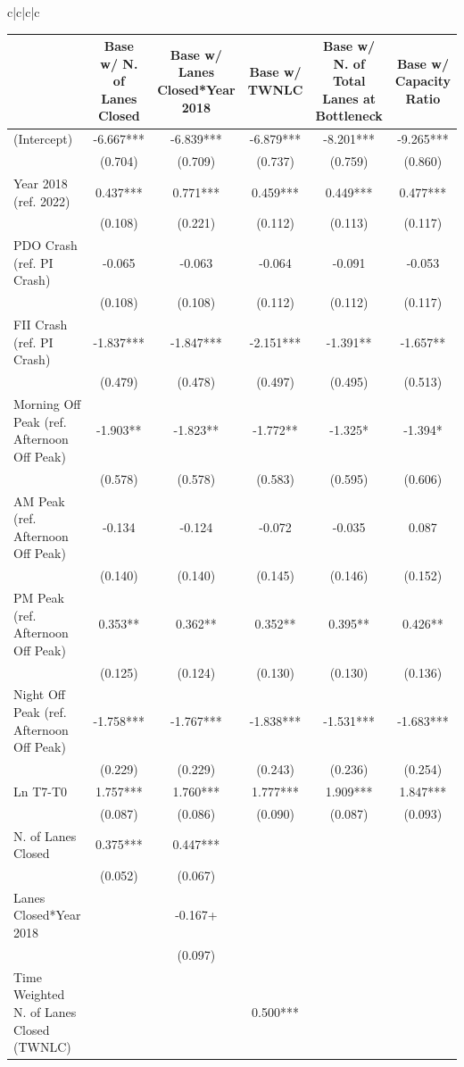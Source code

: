 \documentclass[
  letterpaper,
  authoryear]{elsarticle}
\begin{document}
\begin{table}
{\begin{tabular}[t]{c|c|c|c}
\begin{table}
\begin{table}
{\centering
\begin{tabular}[t]{lccccc}
\toprule
  & Base w/ N. of Lanes Closed & Base w/ Lanes Closed*Year 2018 & Base w/ TWNLC & Base w/ N. of Total Lanes at Bottleneck & Base w/ Capacity Ratio\\
\midrule
(Intercept) & -6.667*** & -6.839*** & -6.879*** & -8.201*** & -9.265***\\
 & (0.704) & (0.709) & (0.737) & (0.759) & (0.860)\\
Year 2018 (ref. 2022) & 0.437*** & 0.771*** & 0.459*** & 0.449*** & 0.477***\\
 & (0.108) & (0.221) & (0.112) & (0.113) & (0.117)\\
PDO Crash (ref. PI Crash) & -0.065 & -0.063 & -0.064 & -0.091 & -0.053\\
 & (0.108) & (0.108) & (0.112) & (0.112) & (0.117)\\
FII Crash (ref. PI Crash) & -1.837*** & -1.847*** & -2.151*** & -1.391** & -1.657**\\
 & (0.479) & (0.478) & (0.497) & (0.495) & (0.513)\\
Morning Off Peak (ref. Afternoon Off Peak) & -1.903** & -1.823** & -1.772** & -1.325* & -1.394*\\
 & (0.578) & (0.578) & (0.583) & (0.595) & (0.606)\\
AM Peak (ref. Afternoon Off Peak) & -0.134 & -0.124 & -0.072 & -0.035 & 0.087\\
 & (0.140) & (0.140) & (0.145) & (0.146) & (0.152)\\
PM Peak (ref. Afternoon Off Peak) & 0.353** & 0.362** & 0.352** & 0.395** & 0.426**\\
 & (0.125) & (0.124) & (0.130) & (0.130) & (0.136)\\
Night Off Peak (ref. Afternoon Off Peak) & -1.758*** & -1.767*** & -1.838*** & -1.531*** & -1.683***\\
 & (0.229) & (0.229) & (0.243) & (0.236) & (0.254)\\
Ln T7-T0 & 1.757*** & 1.760*** & 1.777*** & 1.909*** & 1.847***\\
 & (0.087) & (0.086) & (0.090) & (0.087) & (0.093)\\
N. of Lanes Closed & 0.375*** & 0.447*** &  &  & \\
 & (0.052) & (0.067) &  &  & \\
Lanes Closed*Year 2018 &  & -0.167+ &  &  & \\
 &  & (0.097) &  &  & \\
Time Weighted N. of Lanes Closed (TWNLC) &  &  & 0.500*** &  & \\

\end{tabular}}
\end{table}
\end{table}
\end{tabular}}
\end{table}
\end{document}
